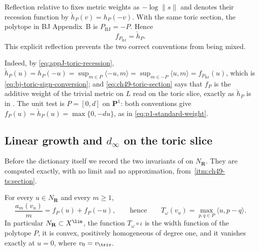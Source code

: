\begin{warning}{Reflection relative to }
\label{warn:ch49-toric-signs}
 fixes metric weights as $-\log\|s\|$ and denotes their recession
function by $\check h_P(v)=h_P(-v)$.  With the same toric section, the
polytope in BJ Appendix~B is $P_{\mathrm{BJ}}=-P$.  Hence
\[
                         f_{P_{\mathrm{BJ}}}=\check h_P.
\tag{49.22}\label{eq:bj-toric-sign-conversion}
\]
This explicit reflection prevents the two correct conventions from being
mixed.
\end{warning}

Indeed, by \eqref{eq:appJ-toric-recession},
$\check h_P(u)=h_P(-u)=\sup_{m\in P}\langle-u,m\rangle
=\sup_{m\in-P}\langle u,m\rangle=f_{P_{\mathrm{BJ}}}(u)$, which is
\eqref{eq:bj-toric-sign-conversion}; and
\eqref{eq:ch49-toric-section} says that $f_P$ is the additive weight of
the trivial metric on $L$ read on the toric slice, exactly as
$\check h_P$ is in .  The unit test is
$P=[0,d]$ on $\mathbf P^1$: both conventions give
$f_P(u)=\check h_P(u)=\max\{0,-du\}$, as in
\eqref{eq:p1-standard-weight}.

\subsection{Linear growth and \texorpdfstring{$d_\infty$}{d infinity} on
the toric slice}
\label{sec:ch49-toric-T}

Before the dictionary itself we record the two invariants of
 on $N_{\mathbf R}$.  They are
computed exactly, with no limit and no approximation, from
\,\cref{itm:ch49-ts:section}.

\begin{proposition}
\label{prop:ch49-toric-T}
For every $u\in N_{\mathbf R}$ and every $m\ge1$,
\[
 \frac{a_m(v_u)}{m}=f_P(u)+f_P(-u),
 \qquad\text{hence}\qquad
 T_\omega(v_u)=\max_{p,q\in P}\langle u,p-q\rangle .
\tag{49.23}\label{eq:ch49-toric-T}
\]
In particular $N_{\mathbf R}\subset X^{\lin}$, the function
$T_\omega\circ\iota$ is the width function of the polytope $P$, it is
convex, positively homogeneous of degree one, and it vanishes exactly at
$u=0$, where $v_0=v_{\triv}$.
\end{proposition}


